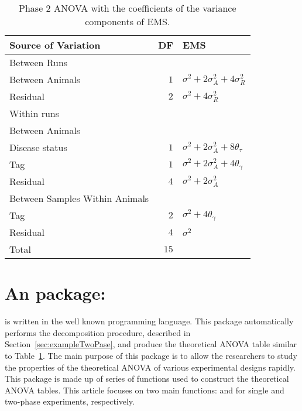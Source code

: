 \documentclass[article]{jss}
\begin{document}
\begin{table}[ht]
\centering
\caption{Phase 2 ANOVA with the coefficients of the variance components of EMS.}
\begin{tabular}[t]{lrl}
\toprule
\multicolumn{1}{l}{\textbf{Source of Variation}} & \multicolumn{1}{l}{\textbf{DF}} & \multicolumn{1}{l}{\textbf{EMS}}\\
\midrule
Between Runs 		\\
\quad Between Animals & $1$ 	& $\sigma^2 + 2\sigma_{A}^2 + 4\sigma_{R}^2$\\
\quad Residual		& $2$ 	& $\sigma^2 + 4\sigma_{R}^2$\\
\hline
Within runs 				\\
\quad Between Animals \\
\quad\quad Disease status  & $1$ 	& $\sigma^2 + 2\sigma_{A}^2 + 8\theta_{\tau}$\\
\quad\quad Tag				& $1$ 	& $\sigma^2 + 2\sigma_{A}^2 + 4\theta_{\gamma}$\\
\quad\quad Residual		& $4$ 	& $\sigma^2 + 2\sigma_{A}^2$\\\hline
\quad Between Samples Within Animals		&\\
\quad\quad Tag				& $2$ 	& $\sigma^2 + 4\theta_{\gamma}$\\
\quad\quad Residual		& $4$ 	& $\sigma^2$\\
\hline
Total 						& $15$      & \\
\bottomrule
\end{tabular}
\label{tab:Phase2ANOVA}
\end{table}


\section[InfoDecompuTE]{An  package: } \label{sec:package}
 is written in the well known  programming language. This package automatically performs the decomposition procedure, described in Section~\ref{sec:exampleTwoPase}, and produce the theoretical ANOVA table similar to Table~\ref{tab:Phase2ANOVA}. The main purpose of this package is to allow the researchers to study the properties of the theoretical ANOVA of various experimental designs rapidly. This package is made up of series of functions used to construct the theoretical ANOVA tables. This article focuses on two main functions:  and  for single and two-phase experiments, respectively. 
\end{document}
